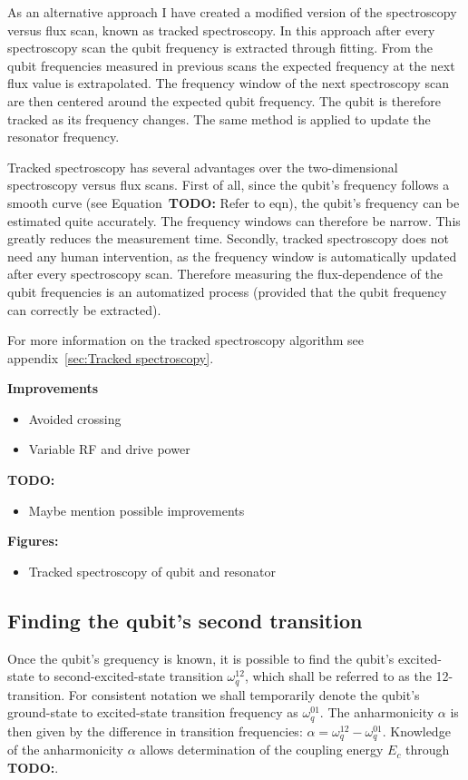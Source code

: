         As an alternative approach I have created a modified version of the spectroscopy versus flux scan, known as tracked spectroscopy. In this approach after every spectroscopy scan the qubit frequency is extracted through fitting. From the qubit frequencies measured in previous scans the expected frequency at the next flux value is extrapolated. The frequency window of the next spectroscopy scan are then centered around the expected qubit frequency. The qubit is therefore tracked as its frequency changes. The same method is applied to update the resonator frequency.

        Tracked spectroscopy has several advantages over the two-dimensional spectroscopy versus flux scans. First of all, since the qubit's frequency follows a smooth curve (see Equation~\textbf{TODO:} Refer to eqn), the qubit's frequency can be estimated quite accurately. The frequency windows can therefore be narrow. This greatly reduces the measurement time. Secondly, tracked spectroscopy does not need any human intervention, as the frequency window is automatically updated after every spectroscopy scan. Therefore measuring the flux-dependence of the qubit frequencies is an automatized process (provided that the qubit frequency can correctly be extracted).

        For more information on the tracked spectroscopy algorithm see appendix~\ref{sec:Tracked spectroscopy}.

        \textbf{Improvements}
        \begin{itemize}
          \item Avoided crossing
          \item Variable RF and drive power
        \end{itemize}
        \textbf{TODO:}
        \begin{itemize}
          \item Maybe mention possible improvements
        \end{itemize}
        \textbf{Figures:}
        \begin{itemize}
          \item Tracked spectroscopy of qubit and resonator
        \end{itemize}

      \subsection{Finding the qubit's second transition}
        \label{ssec:12-transition spectroscopy}
        Once the qubit's grequency is known, it is possible to find the qubit's excited-state to second-excited-state transition $\omega_q^{12}$, which shall be referred to as the 12-transition. For consistent notation we shall temporarily denote the qubit's ground-state to excited-state transition frequency as $\omega_q^{01}$. The anharmonicity $\alpha$ is then given by the difference in transition frequencies: $\alpha = \omega_q^{12} - \omega_q^{01}$. Knowledge of the anharmonicity $\alpha$ allows determination of the coupling energy $E_c$ through \textbf{TODO:}.

